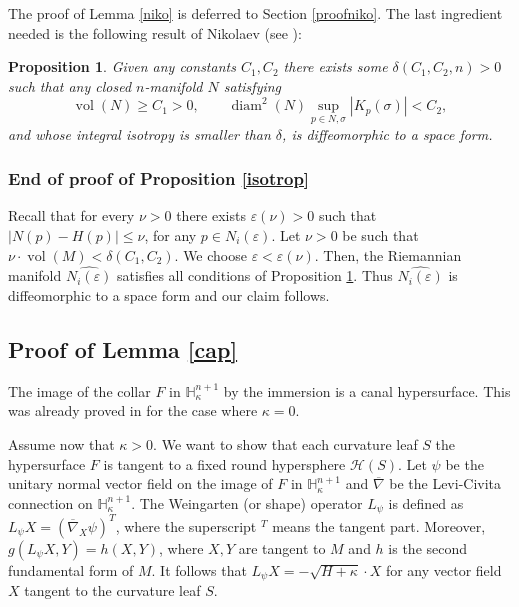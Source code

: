 \documentclass[JEP,XML,SOM,Unicode]{cedram}
\let\mathcal\mathscr
\DeclareMathOperator{\diam}{diam}
\DeclareMathOperator{\vol}{vol}
\let\epsilon\varepsilon
\newtheorem{proposition}[theorem]{Proposition}
\theoremstyle{definition}
\theoremstyle{remark}
\numberwithin{equation}{section}
\begin{document}
The proof of Lemma \ref{niko} is deferred to Section \ref{proofniko}. The last ingredient needed is the following result of Nikolaev
(see \cite{Nik}):
\begin{proposition}\label{Nikolaev}
Given
any constants $C_1,C_2$ there exists
some $\delta(C_1,C_2,n) >0$ such that
any closed $n$-manifold $N$ satisfying
\[
\vol(N) \geq C_1 >0,\qquad
\diam^2(N)\sup_{p\in N, \sigma}|K_p(\sigma)| < C_2,
\]
and whose integral isotropy is smaller than $\delta$,
is diffeomorphic to a space form.
\end{proposition}

\subsubsection*{End of proof of Proposition \ref{isotrop}}
Recall that for every $\nu>0$ there exists $\epsilon(\nu) >0$ such that
$|N(p)-H(p)| \leq \nu $, for any $p\in N_i(\varepsilon)$.
Let $\nu>0$ be such that $\nu \cdot \vol(M) < \delta(C_1,C_2)$. We choose $\varepsilon < \varepsilon(\nu)$.
Then, the Riemannian manifold $\widehat{N_i(\varepsilon)}$ satisfies all conditions of Proposition \ref{Nikolaev}.
Thus $\widehat{N_i(\varepsilon)}$ is diffeomorphic to a
space form and our claim follows.

\subsection{Proof of Lemma \ref{cap}}\label{proofcap}
The image of the collar $F$ in $\mathbb H_{\kappa}^{n+1}$ by the immersion is a canal hypersurface.
This was already proved in \cite{Pi,GM} for the case where $\kappa=0$.

Assume now that $\kappa >0$.
We want to show that each curvature leaf $S$ the hyper\-surface $F$ is tangent to a fixed
round hypersphere $\mathcal H(S)$.
Let $\psi$ be the unitary normal vector field on the image of
$F$ in $\mathbb H_{\kappa}^{n+1}$ and $\overline{\nabla}$ be the
Levi-Civita connection on $\mathbb H_{\kappa}^{n+1}$.
The Weingarten (or shape) operator $L_{\psi}$ is defined as
$L_{\psi}X=(\overline{\nabla}_X\psi)^{T}$, where the superscript $^T$ means
the tangent part. Moreover, $g(L_{\psi}X,Y)=h(X,Y)$, where $X,Y$ are tangent to $M$ and
$h$ is the second fundamental form of $M$. It follows that
$L_{\psi}X=-\sqrt{H+\kappa}\cdot X$
for any vector field $X$ tangent to the curvature leaf $S$.
\end{document}
